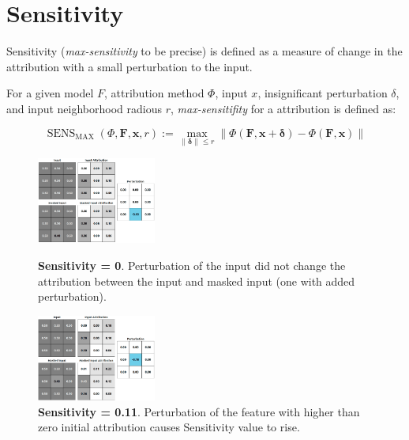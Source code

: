 \section{Sensitivity}\label{section:sensitivity}

Sensitivity \cite{yeh2019fidelity} (\textit{max-sensitivity} to be precise) is defined as a measure of change in the attribution with a small perturbation to the input.


\begin{definition}[Sensitivity]\label{def:sensitivity}
    For a given model $F$, attribution method $\Phi$, input $x$, insignificant perturbation $\delta$, and input neighborhood radious $r$, \textit{max-sensitifity} for a attribution is defined as:
    
    \begin{equation}
        \operatorname{SENS}_{\operatorname{MAX}}(\Phi, \mathbf{F}, \mathbf{x}, r):=\max _{\|\mathbf{\delta}\| \leqslant r} \| \Phi(\mathbf{F}, \mathbf{x} + \mathbf{\delta})-\Phi(\mathbf{F}, \mathbf{x}) \|
        \label{eq:sensitivity}
    \end{equation}
\end{definition}

\begin{figure}
  \includegraphics[width=0.35\textwidth]{methods/images/same-sens.png}
  \caption{\textbf{Sensitivity = 0}. Perturbation of the input did not change the attribution between the input and masked input (one with added perturbation).}\label{fig:sensitivyt-same}
  \smallskip\par
  \includegraphics[width=0.35\textwidth]{methods/images/change-sens.png}
  \caption{\textbf{Sensitivity = 0.11}. Perturbation of the feature with higher than zero initial attribution causes Sensitivity value to rise.}\label{fig:sensitivyt-change}
\end{figure}


